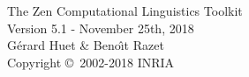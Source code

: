 

\def\lbr{\langle} %
\def\rbr{\rangle} %
\def\lsq{[} %
\def\rsq{]} %
\def\R{{\cal R}} %
\def\otrema{\"o} %
\def\skip{\vspace{10pt}}


%
\begin{center}
\vspace*{24pt}
{\Large The Zen Computational Linguistics Toolkit}\\[10pt]
{\Large Version 5.1 - November 25th, 2018}\\[15pt]
{\large G\'erard Huet \& Beno{\^\i}t Razet}\\[10pt]
{\large Copyright \copyright ~2002-2018 INRIA}\\[20pt]
\end{center}

